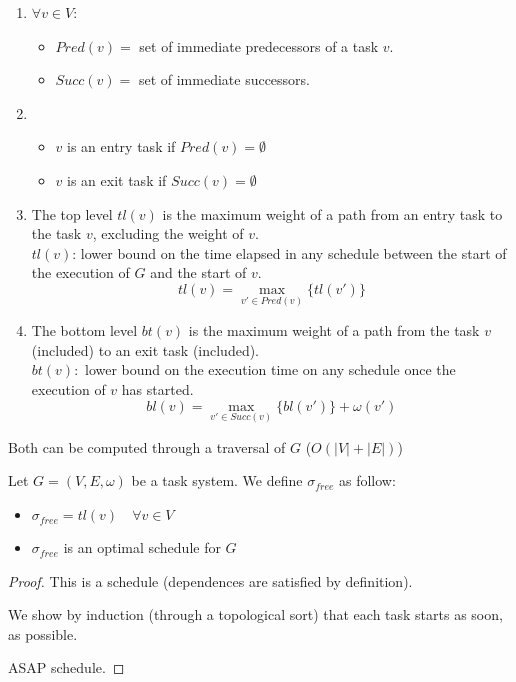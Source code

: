 \begin{defi}
\begin{enumerate}
\item 
$\forall v \in V$:
\begin{itemize}
\item $Pred (v)=$ set of immediate predecessors of a task $v$.
\item $Succ(v)=$ set of immediate successors.
\end{itemize}

\item 

\begin{itemize}
\item $v$ is an entry task if $Pred(v)=\emptyset$
\item $v$ is an exit task if $Succ(v)=\emptyset$
\end{itemize}

\item The top level $tl(v)$ is the maximum weight of a path from an entry task to the task $v$, excluding the weight of $v$.\\
$tl(v)$: lower bound on the time elapsed in any schedule between the start of the execution of $G$ and the start of $v$.
\[tl(v) = \max_{ v' \in Pred(v)} \{ tl(v') \}\]

\item The bottom level $bt(v)$ is the maximum weight of a path from the task $v$ (included) to an exit task (included).\\
$bt(v):$ lower bound on the execution time on any schedule once the execution of $v$ has started.
\[bl(v) = \max_{v' \in Succ(v)} \{ bl(v') \} + \omega(v')\]

\end{enumerate}

Both can be computed through a traversal of $G$ ($O(|V|+|E|)$)
\end{defi}

\begin{thm}
Let $G=(V,E,\omega)$ be a task system. We define $\sigma_{free}$ as follow:
\begin{itemize}
\item $\sigma_{free}=tl(v) \quad \forall v \in V$
\item $\sigma_{free}$ is an optimal schedule for $G$
\end{itemize}
\end{thm}
\begin{proof}
This is a schedule (dependences are satisfied by definition).

We show by induction (through a topological sort) that each task starts as soon, as possible.

ASAP schedule.
\end{proof}

